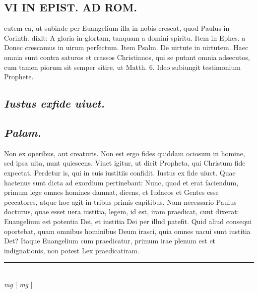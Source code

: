 \documentclass{article}
\begin{document}
\begin{pages}
\section*{VI IN EPIST. AD ROM.  }
\marginpar{[ p.]}\pstart eutem ea, ut subinde per Euangelium illa in nobis crescat, quod Paulus in Corinth. dixit: A gloria in glortam, tanquam a domini spiritu. Item in Ephes. a Donec crescamus in uirum perfectum. Item Psalm.  De uirtute in uirtutem. Haec omnia sunt contra saturos et crassos Christianos, qui se putant omnia adsecutos, cum tamen piorum sit semper sitire, ut Matth. 6.  Ideo subiungit testimonium Prophete.   \pend
{}
{}
\subsection*{\textit{Iustus exfide uiuet. }}
{}
\subsection*{\textit{Palam. }}\pstart Non ex operibus, aut creaturis. Non est ergo fides quiddam ociosum in homine, sed ipsa uita, nunt quiescens. Viuet igitur, ut dicit Propheta, qui Christum fide expectat. Perdetur is, qui in suis iustitiis confidit.  Iustus ex fide uiuct.   \pend\pstart Quae hactenus sunt dicta ad exordium pertinebant: Nunc, quod et erat faciendum, primum lege omnes homines damnat, dicens, et Iudaeos et Gentes esse peccatores, atque hoc agit in tribus primis capitibus. Nam necessario Paulus docturus, quae esset uera iustitia, legem, id est, iram praedicat, cunt dixerat: Euangelium est potentia Dei, et iustitia Dei per illud patefit. Quid aliud consequi oportebat, quam omnibus hominibus Deum irasci, quia omnes uacui sunt iustitia Det? Itaque Euangelium cum praedicatur, primum irae plenum est et indignationis, non potest Lex praedicatiram.   \pend
\vspace{0.5cm}\noindent
\vspace{0.2cm}\rule{1cm}{0.2pt}\\ 
\hspace{0.2cm}\textit{mg}
\footnotesize 
\normalsize| 
\hspace{0.2cm}\textit{mg}
\footnotesize 
\normalsize| 

\end{pages}
\end{document}
